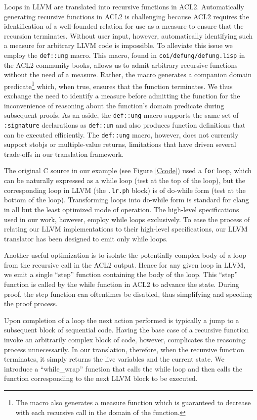 \documentclass{eptcs}
\begin{document}
Loops in LLVM are translated into recursive functions in ACL2.
Automatically generating recursive functions in ACL2 is challenging
because ACL2 requires the identification of a well-founded relation
for use as a measure to ensure that the recursion
terminates.  Without user input, however, 
automatically identifying such a measure for arbitrary LLVM code is 
impossible.  To alleviate this issue we employ the
\texttt{def::ung} macro.  This macro, found in
\texttt{coi/defung/defung.lisp} in the ACL2 community books, allows us to admit arbitrary
recursive functions without the need of a measure.  Rather, the macro
generates a companion domain predicate\footnote{The macro also
generates a measure function which is guaranteed to decrease with
each recursive call in the domain of the function.} which, when true,
ensures that the function terminates.  We thus exchange the need to
identify a measure before admitting the function for the inconvenience
of reasoning about the function's domain predicate during subsequent
proofs.  As an aside, the \texttt{def::ung} macro supports the same
set of \texttt{:signature} declarations as \texttt{def::un} and also
produces function definitions that can be executed efficiently.  The
\texttt{def::ung} macro, however, does not currently support
stobjs or multiple-value returns, limitations that have
driven several trade-offs in our translation framework.

The original C source in our example (see Figure \ref{Ccode}) used
a \texttt{for} loop, which can be naturally expressed as a while loop
(test at the top of the loop), but the
corresponding loop in LLVM (the \texttt{.lr.ph} block) is of do-while
form (test at the bottom of the loop).  Transforming loops into 
do-while form is standard for clang in
all but the least optimized mode of operation.  The high-level
specifications used in our work, however, employ while loops
exclusively.  To ease the process of relating our LLVM implementations
to their high-level specifications, our LLVM translator has been
designed to emit only while loops.

Another useful optimization is to isolate the potentially complex body
of a loop from the recursive call in the ACL2 output. Hence for any given loop in LLVM,
we emit a single ``step'' function containing the body of the
loop. This ``step'' function is called by the while function in ACL2
to advance the state.  During proof, the step function can 
oftentimes be disabled, thus simplifying and speeding the proof process.

Upon completion of a loop the next action performed is typically a
jump to a subsequent block of sequential code.  Having the base case
of a recursive function invoke an arbitrarily complex block of code,
however, complicates the reasoning process unnecessarily.  In our
translation, therefore, when the recursive function terminates, it
simply returns the live variables and the current state.  We
introduce a ``while\_wrap'' function that calls the while loop and
then calls the function corresponding to the next LLVM block to be
executed.
\end{document}
